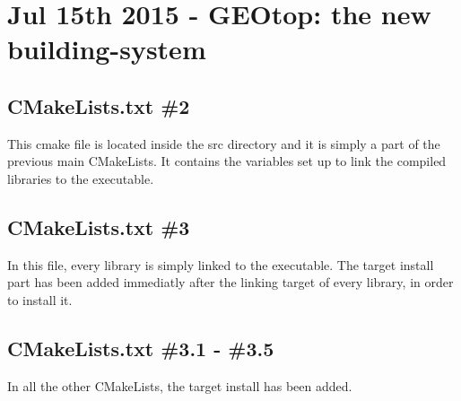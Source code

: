 \section{Jul 15th 2015 - GEOtop: the new building-system}\label{sec:20150715}
\subsection{CMakeLists.txt \#2}

This cmake file is located inside the src directory and it is simply a part of the previous main CMakeLists. It contains the variables set up to link the compiled libraries to the executable.

\subsection{CMakeLists.txt \#3}

In this file, every library is simply linked to the executable. The target install part has been added immediatly after the linking target of every library, in order to install it.

\subsection{CMakeLists.txt \#3.1 - \#3.5}

In all the other CMakeLists, the target install has been added.

